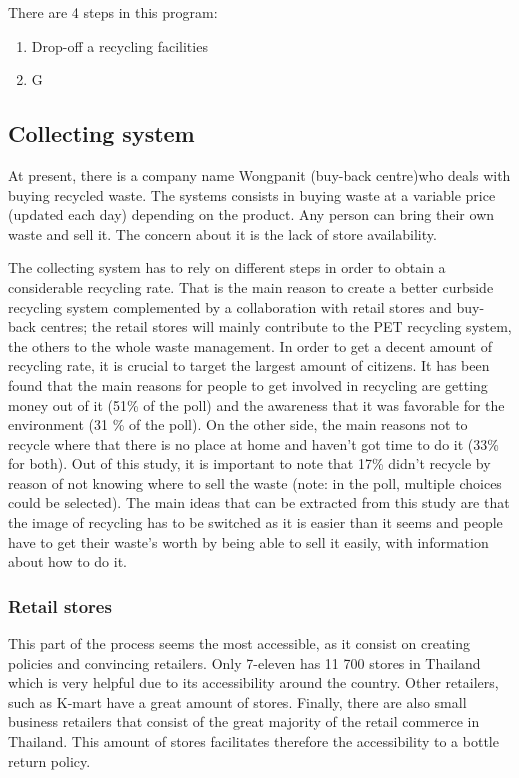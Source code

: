 \documentclass[twoside,a4paper,12pt]{report}
\begin{document}
There are 4 steps in this program:
\begin{enumerate}
    \item Drop-off a recycling facilities
    \item G
\end{enumerate}

\subsection{Collecting system} %
At present, there is a company name Wongpanit (buy-back centre)who deals with buying recycled waste. The systems consists in buying waste at a variable price (updated each day) depending on the product. Any person can bring their own waste and sell it. The concern about it is the lack of store availability.

The collecting system has to rely on different steps in order to obtain a considerable recycling rate. That is the main reason to create a better curbside recycling system complemented by a collaboration with retail stores and buy-back centres; the retail stores will mainly contribute to the PET recycling system, the others to the whole waste management. In order to get a decent amount of recycling rate, it is crucial to target the largest amount of citizens. It has been found that the main reasons for people to get involved in recycling are getting money out of it (51\% of the poll) and the awareness that it was favorable for the environment (31 \% of the poll). On the other side, the main reasons not to recycle where that there is no place at home and haven't got time to do it (33\% for both). Out of this study, it is important to note that 17\% didn't recycle by reason of not knowing where to sell the waste \cite{Wen2014} (note: in the poll, multiple choices could be selected). The main ideas that can be extracted from this study are that the image of recycling has to be switched as it is easier than it seems and people have to get their waste's worth by being able to sell it easily, with information about how to do it. 

\subsubsection{Retail stores}
This part of the process seems the most accessible, as it consist on creating policies and convincing retailers. Only 7-eleven has 11 700 stores in Thailand which is very helpful due to its accessibility around the country. Other retailers, such as K-mart have a great amount of stores. Finally, there are also small business retailers that consist of the great majority of the retail commerce in Thailand. This amount of stores facilitates therefore the accessibility to a bottle return policy.
\end{document}

